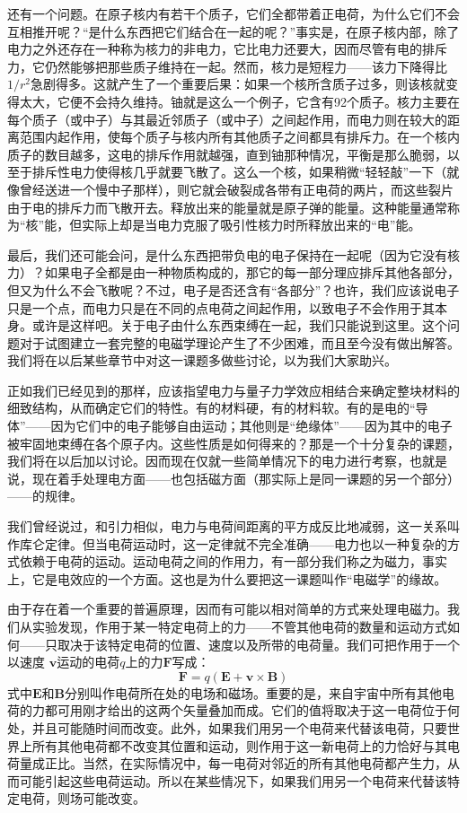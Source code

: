 还有一个问题。在原子核内有若干个质子，它们全都带着正电荷，为什么它们不会互相推开呢？“是什么东西把它们结合在一起的呢？”事实是，在原子核内部，除了电力之外还存在一种称为核力的非电力，它比电力还要大，因而尽管有电的排斥力，它仍然能够把那些质子维持在一起。然而，核力是短程力——该力下降得比$1/r^2$急剧得多。这就产生了一个重要后果：如果一个核所含质子过多，则该核就变得太大，它便不会持久维持。铀就是这么一个例子，它含有92个质子。核力主要在每个质子（或中子）与其最近邻质子（或中子）之间起作用，而电力则在较大的距离范围内起作用，使每个质子与核内所有其他质子之间都具有排斥力。在一个核内质子的数目越多，这电的排斥作用就越强，直到铀那种情况，平衡是那么脆弱，以至于排斥性电力使得核几乎就要飞散了。这么一个核，如果稍微“轻轻敲”一下（就像曾经送进一个慢中子那样），则它就会破裂成各带有正电荷的两片，而这些裂片由于电的排斥力而飞散开去。释放出来的能量就是原子弹的能量。这种能量通常称为“核”能，但实际上却是当电力克服了吸引性核力时所释放出来的“电”能。

最后，我们还可能会问，是什么东西把带负电的电子保持在一起呢（因为它没有核力）？如果电子全都是由一种物质构成的，那它的每一部分理应排斥其他各部分，但又为什么不会飞散呢？不过，电子是否还含有“各部分”？也许，我们应该说电子只是一个点，而电力只是在不同的点电荷之间起作用，以致电子不会作用于其本身。或许是这样吧。关于电子由什么东西束缚在一起，我们只能说到这里。这个问题对于试图建立一套完整的电磁学理论产生了不少困难，而且至今没有做出解答。我们将在以后某些章节中对这一课题多做些讨论，以为我们大家助兴。

正如我们已经见到的那样，应该指望电力与量子力学效应相结合来确定整块材料的细致结构，从而确定它们的特性。有的材料硬，有的材料软。有的是电的“导体”——因为它们中的电子能够自由运动；其他则是“绝缘体”——因为其中的电子被牢固地束缚在各个原子内。这些性质是如何得来的？那是一个十分复杂的课题，我们将在以后加以讨论。因而现在仅就一些简单情况下的电力进行考察，也就是说，现在着手处理电方面——也包括磁方面（那实际上是同一课题的另一个部分）——的规律。

我们曾经说过，和引力相似，电力与电荷间距离的平方成反比地减弱，这一关系叫作库仑定律。但当电荷运动时，这一定律就不完全准确——电力也以一种复杂的方式依赖于电荷的运动。运动电荷之间的作用力，有一部分我们称之为磁力，事实上，它是电效应的一个方面。这也是为什么要把这一课题叫作“电磁学”的缘故。

由于存在着一个重要的普遍原理，因而有可能以相对简单的方式来处理电磁力。我们从实验发现，作用于某一特定电荷上的力——不管其他电荷的数量和运动方式如何——只取决于该特定电荷的位置、速度以及所带的电荷量。我们可把作用于一个以速度 $\boldsymbol{v}$运动的电荷$q$上的力$\boldsymbol{F}$写成：
\begin{equation}
    \label{Eq:II:1:1}
    \boldsymbol{F} = q(\boldsymbol{E} + \boldsymbol{v} \times \boldsymbol{B})
\end{equation}
式中$\boldsymbol{E}$和$\boldsymbol{B}$分别叫作电荷所在处的电场和磁场。重要的是，来自宇宙中所有其他电荷的力都可用刚才给出的这两个矢量叠加而成。它们的值将取决于这一电荷位于何处，并且可能随时间而改变。此外，如果我们用另一个电荷来代替该电荷，只要世界上所有其他电荷都不改变其位置和运动，则作用于这一新电荷上的力恰好与其电荷量成正比。当然，在实际情况中，每一电荷对邻近的所有其他电荷都产生力，从而可能引起这些电荷运动。所以在某些情况下，如果我们用另一个电荷来代替该特定电荷，则场可能改变。

